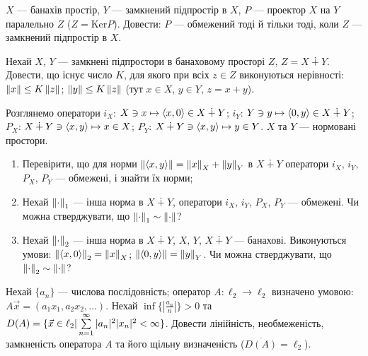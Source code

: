 
\begin{exercise}
    $X$ --- банахів простір, $Y$ --- замкнений підпростір в $X$, 
    $P$ --- проектор $X$ на $Y$ паралельно $Z$ ($Z = \mathrm{Ker} P$). 
    Довести: $P$ --- обмежений тоді й тільки тоді, коли $Z$ --- 
    замкнений підпростір в $X$.
\end{exercise}

\begin{exercise}
    Нехай $X$, $Y$ --- замкнені підпростори в банаховому просторі $Z$, 
    $Z = X \dotplus Y$. Довести, що існує число $K$, для якого при всіх $z \in Z$ 
    виконуються нерівності: $\left\lVert x\right\rVert \leq K\left\lVert z\right\rVert$; $\left\lVert y\right\rVert \leq K\left\lVert z\right\rVert$ (тут 
    $x \in X$, $y \in Y$, $z = x + y$). 
\end{exercise}

\begin{exercise}
    Розглянемо оператори $i_X$: $X \ni x \mapsto 
    \left\langle x, 0\right\rangle \in X \dotplus Y$;
    $i_Y$: $Y \ni y \mapsto 
    \left\langle0, y\right\rangle \in X \dotplus Y$;
    $P_X$: $X \dotplus Y \ni \left\langle x, y\right\rangle \mapsto 
    x \in X $;
    $P_Y$: $X \dotplus Y \ni \left\langle x, y\right\rangle \mapsto 
    y \in Y $. $X$ та $Y$ --- нормовані простори.
    \begin{enumerate}
        \item Перевірити, що для норми $\left\lVert\left\langle x, y\right\rangle\right\rVert = 
        \left\lVert x\right\rVert_X + \left\lVert y\right\rVert_Y$ в $X \dotplus Y$ оператори $i_X$, $i_Y$, 
        $P_X$, $P_Y$ --- обмежені, і знайти їх норми;
        \item Нехай $\left\lVert\cdot\right\rVert_1$ --- інша норма в $X \dotplus Y$, 
        оператори $i_X$, $i_Y$, $P_X$, $P_Y$ --- обмежені. Чи можна 
        стверджувати, що $\left\lVert\cdot\right\rVert_1 \sim \left\lVert\cdot\right\rVert$?
        \item Нехай $\left\lVert\cdot\right\rVert_2$ --- інша норма в $X \dotplus Y$,
        $X$, $Y$, $X \dotplus Y$ --- банахові. Виконуються умови: 
        $\left\lVert\left\langle x, 0\right\rangle\right\rVert_2 = \left\lVert x\right\rVert_X$; $\left\lVert\left\langle0, y\right\rangle\right\rVert 
        = \left\lVert y\right\rVert_Y$. Чи можна 
        стверджувати, що $\left\lVert\cdot\right\rVert_2 \sim \left\lVert\cdot\right\rVert$?
    \end{enumerate}
\end{exercise}

\begin{exercise}\label{N:2_1_18}
    Нехай $\{a_n\}$ --- числова послідовність; оператор $A: \ell_2 
    \rightarrow \ell_2$ визначено умовою: $A\vec{x} = 
    (a_1x_1, a_2x_2, ...)$. Нехай $\inf\{|\frac{a_n}{n}|\} > 0$ та 
    $D(A) = \{\vec{x} \in \ell_2 | \sum\limits_{n=1}^{\infty}|a_n|^2|x_n|^2 
    < \infty\}$. Довести лінійність, необмеженість, замкненість оператора 
    $A$ та його щільну визначеність ($\overline{D(A)} = \ell_2$).
\end{exercise}

